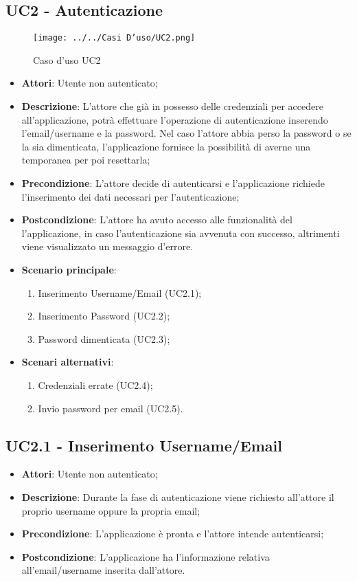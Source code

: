 \subsection{UC2 - Autenticazione} 
\label{ssec:UC2} 
\begin{figure}[h!] 
\centering 
\texttt{[image: ../../Casi D'uso/UC2.png]} 
\caption{Caso d'uso UC2} 
 \end{figure} 
\begin{itemize} 
\item \textbf{Attori}: Utente non autenticato;
\item \textbf{Descrizione}: L'attore che già in possesso delle credenziali per accedere all'applicazione, potrà effettuare l'operazione di autenticazione inserendo l'email/username e la password. Nel caso l’attore abbia perso la password o se la sia dimenticata, l'applicazione fornisce la possibilità di averne una temporanea per poi resettarla;
\item \textbf{Precondizione}: L'attore decide di autenticarsi e l'applicazione richiede l'inserimento dei dati necessari per l'autenticazione;
\item \textbf{Postcondizione}: L'attore ha avuto accesso alle funzionalità del l'applicazione, in caso l'autenticazione sia avvenuta con successo, altrimenti viene visualizzato un messaggio d'errore.
\item \textbf{Scenario principale}: \begin{enumerate}\item Inserimento Username/Email (UC2.1);\item Inserimento Password (UC2.2);\item Password dimenticata (UC2.3);  \end{enumerate}

\item \textbf{Scenari alternativi}: \begin{enumerate}
\item Credenziali errate (UC2.4);\item Invio password per email (UC2.5). \end{enumerate}

\end{itemize} 
\subsection{UC2.1 - Inserimento Username/Email} 
\label{ssec:UC2.1} 
\begin{itemize} 
\item \textbf{Attori}: Utente non autenticato;
\item \textbf{Descrizione}: Durante la fase di autenticazione viene richiesto all'attore il proprio username oppure la propria email;
\item \textbf{Precondizione}: L'applicazione è pronta e l'attore intende autenticarsi;
\item \textbf{Postcondizione}: L'applicazione ha l’informazione relativa all'email/username inserita dall’attore.
\end{itemize} 
